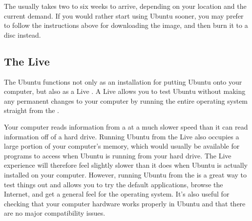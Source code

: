 The  usually takes two to six weeks to arrive, depending on your location and the current demand. If you would rather start using Ubuntu sooner, you may prefer to follow the instructions above for downloading the  image, and then burn it to a disc instead.


\subsection{The Live }
\label{sec:livecd}

The Ubuntu  functions not only as an installation  for putting Ubuntu onto your computer, but also as a Live . A Live  allows you to test Ubuntu without making any permanent changes to your computer by running the entire operating system straight from the . 

Your computer reads information from a  at a much slower speed than it can read information off of a hard drive. Running Ubuntu from the Live  also occupies a large portion of your computer's memory, which would usually be available for programs to access when Ubuntu is running from your hard drive. The Live  experience will therefore feel slightly slower than it does when Ubuntu is actually installed on your computer. However, running Ubuntu from the  is a great way to test things out and allows you to try the default applications, browse the Internet, and get a general feel for the operating system. It's also useful for checking that your computer hardware works properly in Ubuntu and that there are no major compatibility issues.

